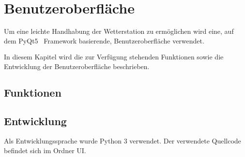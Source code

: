 \section{Benutzeroberfläche}\label{sec:benutzeroberflaeche}
Um eine leichte Handhabung der Wetterstation zu ermöglichen wird eine, auf dem PyQt5~\cite{pyqt5} Framework basierende, Benutzeroberfläche verwendet.

In diesem Kapitel wird die zur Verfügung stehenden Funktionen sowie die Entwicklung der Benutzeroberfläche beschrieben.

\subsection{Funktionen}\label{sec:bo_funktionen}

\subsection{Entwicklung}\label{sec:bo_entwicklung}
Als Entwicklungssprache wurde Python 3 verwendet. Der verwendete Quellcode befindet sich im Ordner \textrm{UI}. 


